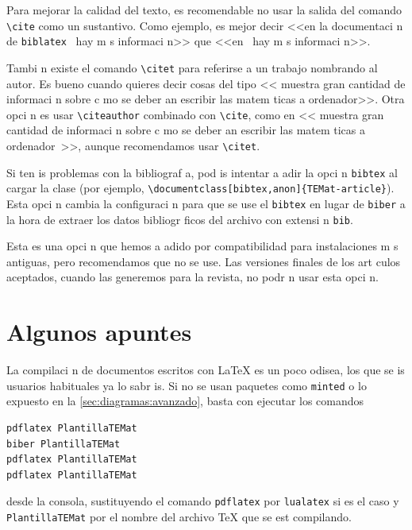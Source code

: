 \documentclass{article}
\begin{document}
\begin{nota}
Para mejorar la calidad del texto, es recomendable no usar la salida del comando \verb+\cite+ como un sustantivo.
Como ejemplo, es mejor decir <<en la documentaci n de \texttt{biblatex}~\cite{biblatex} hay m s informaci n>> que <<en~\cite{biblatex} hay m s informaci n>>.

Tambi n existe el comando \verb+\citet+ para referirse a un trabajo nombrando al autor.
Es bueno cuando quieres decir cosas del tipo <<\citet{bezosOM} muestra gran cantidad de informaci n sobre c mo se deber an escribir las matem ticas a ordenador>>. Otra opci n es usar \verb+\citeauthor+ combinado con \verb+\cite+, como en <<\citeauthor{bezosOM} muestra gran cantidad de informaci n sobre c mo se deber an escribir las matem ticas a ordenador~\cite{bezosOM}>>, aunque recomendamos usar \verb+\citet+.
\end{nota}

\begin{nota}
Si ten is problemas con la bibliograf a, pod is intentar a adir la opci n \verb+bibtex+ al cargar la clase (por ejemplo, \verb+\documentclass[bibtex,anon]{TEMat-article}+).
Esta opci n cambia la configuraci n para que se use el  \verb+bibtex+ en lugar de \verb+biber+ a la hora de extraer los datos bibliogr ficos del archivo con extensi n \verb+bib+.

Esta es una opci n que hemos a adido por compatibilidad para instalaciones m s antiguas, pero recomendamos que no se use.
Las versiones finales de los art culos aceptados, cuando las generemos para la revista, no podr n usar esta opci n.
\end{nota}

\section{Algunos apuntes}\label{sec:apuntes}
La compilaci n de documentos escritos con \LaTeX{} es un poco odisea, los que se is usuarios habituales ya lo sabr is.
Si no se usan paquetes como \verb+minted+ o lo expuesto en la \cref{sec:diagramas:avanzado}, basta con ejecutar los comandos
\begin{verbatim}
pdflatex PlantillaTEMat
biber PlantillaTEMat
pdflatex PlantillaTEMat
pdflatex PlantillaTEMat
\end{verbatim}
desde la consola, sustituyendo el comando \verb+pdflatex+ por \verb+lualatex+ si es el caso y \verb+PlantillaTEMat+ por el nombre del archivo \TeX{} que se est  compilando.
\end{document}
